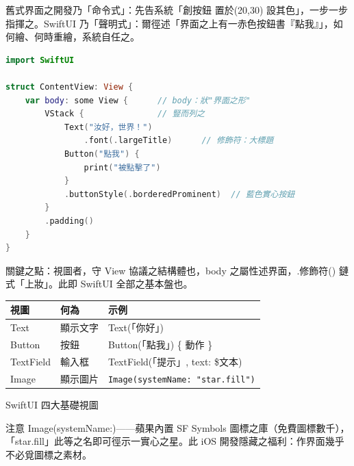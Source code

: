 


舊式界面之開發乃「命令式」：先告系統「創按鈕 置於(20,30) 設其色」，一步一步指揮之。SwiftUI 乃「聲明式」：爾徑述「界面之上有一赤色按鈕書『點我』」，如何繪、何時重繪，系統自任之。

\begin{lstlisting}[language=Swift]
import SwiftUI

struct ContentView: View {
    var body: some View {      // body：狀"界面之形"
        VStack {               // 豎而列之
            Text("汝好，世界！")
                .font(.largeTitle)      // 修飾符：大標題
            Button("點我") {
                print("被點擊了")
            }
            .buttonStyle(.borderedProminent)  // 藍色實心按鈕
        }
        .padding()
    }
}
\end{lstlisting}

關鍵之點：視圖者，守 View 協議之結構體也，body 之屬性述界面，.修飾符() 鏈式「上妝」。此即 SwiftUI 全部之基本盤也。


\begin{center}
\begin{tabularx}{\linewidth}{|X|X|X|}
\hline
\textbf{視圖} & \textbf{何為} & \textbf{示例} \tabularnewline
\hline
Text & 顯示文字 & Text(「你好」) \tabularnewline
Button & 按鈕 & Button(「點我」) \{ 動作 \} \tabularnewline
TextField & 輸入框 & TextField(「提示」, text: \$文本) \tabularnewline
Image & 顯示圖片 & \texttt{Image(systemName: "star.\allowbreak fill")} \tabularnewline
\hline
\end{tabularx}
\end{center}

\begin{center}\small\color{gray}SwiftUI 四大基礎視圖\end{center}

注意 Image(systemName:)——蘋果內置 SF Symbols 圖標之庫（免費圖標數千），「star.fill」此等之名即可徑示一實心之星。此 iOS 開發隱藏之福利：作界面幾乎不必覓圖標之素材。


